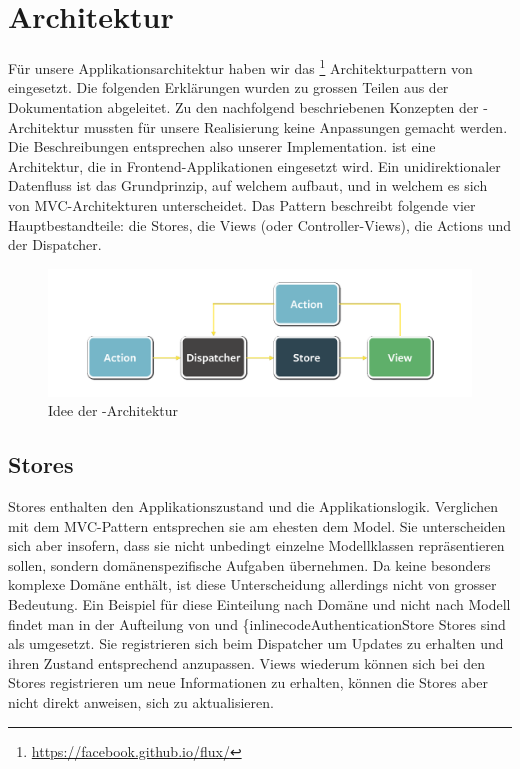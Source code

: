 \label{pd-architektur}
\section{Architektur}
Für unsere Applikationsarchitektur haben wir das \footnote{\url{https://facebook.github.io/flux/}} Architekturpattern von  eingesetzt.\newline
Die folgenden Erklärungen wurden zu grossen Teilen aus der  Dokumentation\cite{flux-docs-overview} abgeleitet.
Zu den nachfolgend beschriebenen Konzepten der -Architektur mussten für unsere Realisierung keine Anpassungen gemacht werden.
Die Beschreibungen entsprechen also unserer Implementation.\newline
{} ist eine Architektur, die in \gls{Frontend}-Applikationen eingesetzt wird.
Ein unidirektionaler Datenfluss ist das Grundprinzip, auf welchem  aufbaut, und in welchem es sich von \gls{MVC}-Architekturen unterscheidet.
Das Pattern beschreibt folgende vier Hauptbestandteile: die Stores, die Views (oder Controller-Views), die Actions und der Dispatcher.
\begin{figure}[H]
 	\centering
 	\includegraphics[width=\textwidth]{images/projektdokumentation/flux-uebersicht-weiss.png}
 	\caption{Idee der -Architektur}
 	\label{image-flux-overview-simple}
\end{figure}
\subsection{Stores}
Stores enthalten den Applikationszustand und die Applikationslogik.
Verglichen mit dem \gls{MVC}-Pattern entsprechen sie am ehesten dem Model.
Sie unterscheiden sich aber insofern, dass sie nicht unbedingt einzelne Modellklassen repräsentieren sollen, sondern domänenspezifische Aufgaben übernehmen.
Da \kort{} keine besonders komplexe Domäne enthält, ist diese Unterscheidung allerdings nicht von grosser Bedeutung.
Ein Beispiel für diese Einteilung nach Domäne und nicht nach Modell findet man in der Aufteilung von  und \{inlinecode{AuthenticationStore}\newline
Stores sind als  umgesetzt.
Sie registrieren sich beim Dispatcher um Updates zu erhalten und ihren Zustand entsprechend anzupassen.
Views wiederum können sich bei den Stores registrieren um neue Informationen zu erhalten, können die Stores aber nicht direkt anweisen, sich zu aktualisieren.

